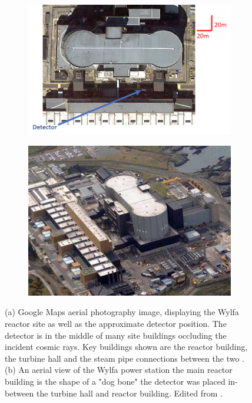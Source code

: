 \begin{figure}[!h]
\centering
\begin{subfigure}{.5\textwidth}
  \centering
  \includegraphics[width=\linewidth]{Chapter5/Figs/wylfaRasterNew/DetectorPositionTopDown.png}
  \captionsetup{width=.9\linewidth}
  \caption{}
  \label{subFig:DetectorPositionTopDown}
\end{subfigure}%
\begin{subfigure}{.5\textwidth}
  \centering
\includegraphics[width=\linewidth]{Chapter5/Figs/Raster/wylfaArielView.png}
  \captionsetup{width=.9\linewidth}
  \caption{}
  \label{subFig:wylfaArielView}
\end{subfigure}
\caption{(a) Google Maps aerial photography image, displaying the Wylfa reactor site as well as the approximate detector position. The detector is in the middle of many site buildings occluding the incident cosmic rays. Key buildings shown are the reactor building, the turbine hall and the steam pipe connections between the two \cite{GoogleMapsWylfaLink}. (b) An aerial view of the Wylfa power station the main reactor building is the shape of a "dog bone" the detector was placed in-between the turbine hall and reactor building. Edited from \cite{wylfaDronePictureLink}.}
\label{fig:DetectorPosition_TopDownAndAriel}
\end{figure}


